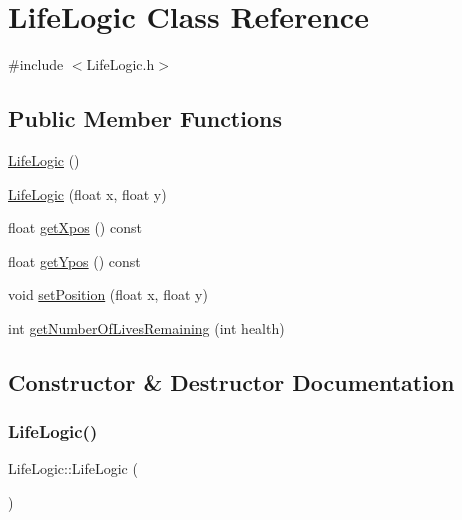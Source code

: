 \hypertarget{class_life_logic}{}\section{Life\+Logic Class Reference}
\label{class_life_logic}


{\ttfamily \#include $<$Life\+Logic.\+h$>$}

\subsection*{Public Member Functions}
\begin{DoxyCompactItemize}
\item 
\hyperlink{class_life_logic_ac2ebda8b161db29ff60a2928f49c2ef6}{Life\+Logic} ()
\item 
\hyperlink{class_life_logic_a535c38f9912f4298ebd1b86425a5cd59}{Life\+Logic} (float x, float y)
\item 
float \hyperlink{class_life_logic_a84143479d62e550adebd0c319ae3520a}{get\+Xpos} () const
\item 
float \hyperlink{class_life_logic_a7b7591ddd38994fc052a022177690d72}{get\+Ypos} () const
\item 
void \hyperlink{class_life_logic_a6080cbd8a0c6f6767504974999061209}{set\+Position} (float x, float y)
\item 
int \hyperlink{class_life_logic_aedae9924b6ebe33182c3b8b8150b8060}{get\+Number\+Of\+Lives\+Remaining} (int health)
\end{DoxyCompactItemize}


\subsection{Constructor \& Destructor Documentation}
\mbox{\label{class_life_logic_ac2ebda8b161db29ff60a2928f49c2ef6}} 
\subsubsection{\texorpdfstring{Life\+Logic()}{LifeLogic()}\hspace{0.1cm}{\footnotesize\ttfamily [1/2]}}
{\footnotesize\ttfamily Life\+Logic\+::\+Life\+Logic (\begin{DoxyParamCaption}{ }\end{DoxyParamCaption})}

